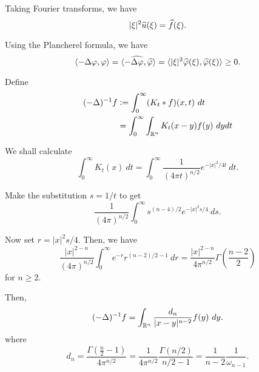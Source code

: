 Taking Fourier transforms, we have 
\begin{equation*}
    |\xi|^2\widehat{u}(\xi) = \widehat{f}(\xi).
\end{equation*}

Using the Plancherel formula, we have 
\begin{equation*}
    \langle-\Delta\varphi,\varphi\rangle = \langle -\widehat{\Delta\varphi},\widehat{\varphi}\rangle = \langle|\xi|^2\widehat{\varphi}(\xi), \widehat{\varphi}(\xi)\rangle\ge 0.
\end{equation*}

Define 
\begin{align*}
    (-\Delta)^{-1}f &:= \int_0^\infty (K_t\ast f)(x, t)~dt\\
    &= \int_{0}^\infty\int_{\mathbb{R}^n} K_t(x - y)f(y)~dydt\\
\end{align*}

We shall calculate 
\begin{equation*}
    \int_{0}^\infty K_t(x)~dt = \int_0^\infty \frac{1}{(4\pi t)^{n/2}}e^{-|x|^2/4t}~dt.
\end{equation*}

Make the substitution $s = 1/t$ to get 
\begin{equation*}
    \frac{1}{(4\pi)^{n/2}}\int_0^\infty s^{(n - 4)/2}e^{-|x|^2s/4}~ds.
\end{equation*}

Now set $r = |x|^2s/4$. Then, we have 
\begin{equation*}
    \frac{|x|^{2 - n}}{(4\pi)^{n/2}}\int_0^\infty e^{-r}r^{(n - 2)/2 - 1}~dr = \frac{|x|^{2 - n}}{4\pi^{n/2}}\Gamma\left(\frac{n - 2}{2}\right)
\end{equation*}
for $n\ge 2$.

Then, 
\begin{equation*}
    (-\Delta)^{-1}f = \int_{\mathbb{R}^n}\frac{d_n}{|x - y|^{n - 2}}f(y)~dy.
\end{equation*}
where 
\begin{equation*}
    d_n = \frac{\Gamma\left(\frac{n}{2} - 1\right)}{4\pi^{n/2}} = \frac{1}{4\pi^{n/2}}\frac{\Gamma(n/2)}{n/2 - 1} = \frac{1}{n - 2}\frac{1}{\omega_{n - 1}}.
\end{equation*}